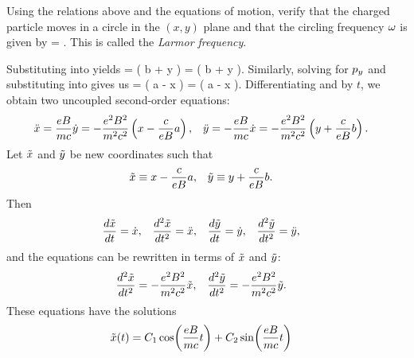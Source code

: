 \newcommand{\xdd}{\ddot{x}}
\newcommand{\ydd}{\ddot{y}}

\newcommand{\xc}{x_c}
\newcommand{\yc}{y_c}
\newcommand{\xddc}{\ddot{x}_c}
\newcommand{\yddc}{\ddot{y}_c}

\newcommand{\xxt}{x(t)}
\newcommand{\yyt}{y(t)}
\newcommand{\xct}{\xc(t)}
\newcommand{\yct}{\yc(t)}
\newcommand{\xpt}{x_p(t)}
\newcommand{\ypt}{y_p(t)}

\begin{problem}
	Using the relations above and the equations of motion, verify that the charged particle moves in a circle in the $(x, y)$ plane and that the circling frequency $\omega$ is given by
	\beq
		\omg = .
	\eeq
This is called the \emph{Larmor frequency}.
\end{problem}

\begin{solution}
	Substituting  into  yields
	\beqn \label{xd2}
		\xd =  \left( b +  y \right)
		=  \left(  b + y \right).
	\eeqn
	Similarly, solving  for $p_y$ and substituting into  gives us
	\beqn \label{yd2}
		\yd =  \left( a -  x \right)
		=  \left(  a - x \right).
	\eeqn
	Differentiating  and  by $t$, we obtain two uncoupled second-order equations:
	\begin{align} \label{sys}
		\xdd &= \frac{e B}{m c} \yd
		= -\frac{e^2 B^2}{m^2 c^2} \left( x - \frac{c}{e B} a \right), &
		\ydd &= -\frac{e B}{m c} \xd
		= -\frac{e^2 B^2}{m^2 c^2} \left( y + \frac{c}{e B} b \right).
	\end{align}
	Let $\tilde{x}$ and $\tilde{y}$ be new coordinates such that
	\begin{align*}
		\tilde{x} &\equiv x - \frac{c}{e B} a, &
		\tilde{y} &\equiv y + \frac{c}{e B} b.
	\end{align*}
	Then
	\begin{align*}
		\dv{\xt}{t} &= \xd, &
		\dv[2]{\xt}{t} &= \xdd, &
		\dv{\yt}{t} &= \yd, &
		\dv[2]{\yt}{t} &= \ydd,
	\end{align*}
	and the equations  can be rewritten in terms of $\tilde{x}$ and $\tilde{y}$:
	\begin{align*}
		\dv[2]{\tilde{x}}{t} &= -\frac{e^2 B^2}{m^2 c^2} \tilde{x}, &
		\dv[2]{\tilde{y}}{t} &= -\frac{e^2 B^2}{m^2 c^2} \tilde{y}.
	\end{align*}
	These equations have the solutions
	\begin{align*}
		\xt(t) &= \Cq \cos(\frac{e B}{m c} t) + \Cw \sin(\frac{e B}{m c} t)

\end{align*}
\end{solution}
